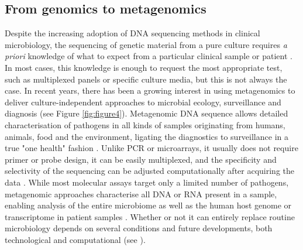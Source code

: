 \subsection{From genomics to metagenomics} \label{ssec:metagenomics}

Despite the increasing adoption of DNA sequencing methods in clinical microbiology, the sequencing of genetic material from a pure culture requires \textit{a priori} knowledge of what to expect from a particular clinical sample or patient \citep{schuele_future_2021}. 
In most cases, this knowledge is enough to request the most appropriate test, such as multiplexed panels or specific culture media, but this is not always the case. 
In recent years, there has been a growing interest in using metagenomics to deliver culture-independent approaches to microbial ecology, surveillance and diagnosis (see Figure \ref{fig:figure4})\citep{loman_twenty_2015, loman_high-throughput_2012}.
Metagenomic DNA sequence allows detailed characterisation of pathogens in all kinds of samples originating from humans, animals, food and the environment, ligating the diagnostics to surveillance in a true "one health" fashion \citep{rossen__2018}. 
Unlike PCR or microarrays, it usually does not require primer or probe design, it can be easily multiplexed, and the specificity and selectivity of the sequencing can be adjusted computationally after acquiring the data \citep{dunne_next-generation_2012}.  
While most molecular assays target only a limited number of pathogens, metagenomic approaches characterise all DNA or RNA present in a sample, enabling analysis of the entire microbiome as well as the human host genome or transcriptome in patient samples \citep{chiu_clinical_2019}. 
Whether or not it can entirely replace routine microbiology depends on several conditions and future developments, both technological and computational (see ).

